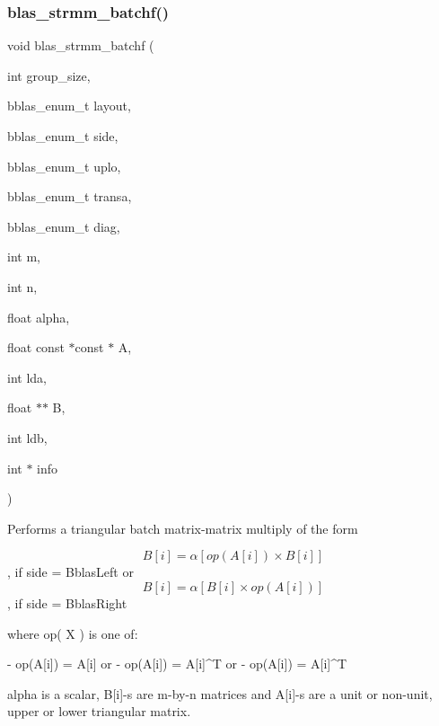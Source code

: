 \subsubsection{\texorpdfstring{blas\+\_\+strmm\+\_\+batchf()}{blas\_strmm\_batchf()}}
{\footnotesize\ttfamily void blas\+\_\+strmm\+\_\+batchf (\begin{DoxyParamCaption}\item[{int}]{group\+\_\+size,  }\item[{bblas\+\_\+enum\+\_\+t}]{layout,  }\item[{bblas\+\_\+enum\+\_\+t}]{side,  }\item[{bblas\+\_\+enum\+\_\+t}]{uplo,  }\item[{bblas\+\_\+enum\+\_\+t}]{transa,  }\item[{bblas\+\_\+enum\+\_\+t}]{diag,  }\item[{int}]{m,  }\item[{int}]{n,  }\item[{float}]{alpha,  }\item[{float const $\ast$const $\ast$}]{A,  }\item[{int}]{lda,  }\item[{float $\ast$$\ast$}]{B,  }\item[{int}]{ldb,  }\item[{int $\ast$}]{info }\end{DoxyParamCaption})}

Performs a triangular batch matrix-\/matrix multiply of the form

\[B[i] = \alpha [op( A[i] ) \times B[i]] \], if side = Bblas\+Left or \[B[i] = \alpha [B[i] \times op( A[i]) ] \], if side = Bblas\+Right

where op( X ) is one of\+: \begin{DoxyVerb}    - op(A[i]) = A[i]   or
    - op(A[i]) = A[i]^T or
    - op(A[i]) = A[i]^T
\end{DoxyVerb}


alpha is a scalar, B\mbox{[}i\mbox{]}-\/s are m-\/by-\/n matrices and A\mbox{[}i\mbox{]}-\/s are a unit or non-\/unit, upper or lower triangular matrix.


